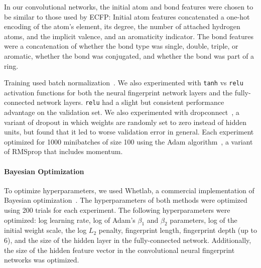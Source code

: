 \documentclass{article}
\newcommand{\citep}{\cite}
\begin{document}
In our convolutional networks, the initial atom and bond features were chosen to be similar to those used by ECFP:
Initial atom features concatenated a one-hot encoding of the atom's element, its degree, the number of attached hydrogen atoms, and the implicit valence, and an aromaticity indicator.
The bond features were a concatenation of whether the bond type was single, double, triple, or aromatic, whether the bond was conjugated, and whether the bond was part of a ring.

Training used batch normalization~\citep{ioffe2015batch}.
We also experimented with \texttt{tanh} vs \texttt{relu} activation functions for both the neural fingerprint network layers and the fully-connected network layers.
\texttt{relu} had a slight but consistent performance advantage on the validation set.
We also experimented with dropconnect~\citep{wan2013regularization}, a variant of dropout in which weights are randomly set to zero instead of hidden units, but found that it led to worse validation error in general.
Each experiment optimized for 1000 minibatches of size 100 using the Adam algorithm~\citep{Adam14}, a variant of RMSprop that includes momentum.

\paragraph{Bayesian Optimization}
To optimize hyperparameters, we used Whetlab, a commercial implementation of Bayesian optimization~\citep{snoek2012practical}.
The hyperparameters of both methods were optimized using 200 trials for each experiment.
The following hyperparameters were optimized: log learning rate, log of Adam's $\beta_1$ and $\beta_2$ parameters, log of the initial weight scale, the log $L_2$ penalty, fingerprint length, fingerprint depth (up to 6), and the size of the hidden layer in the fully-connected network.
Additionally, the size of the hidden feature vector in the convolutional neural fingerprint networks was optimized.
\end{document}
